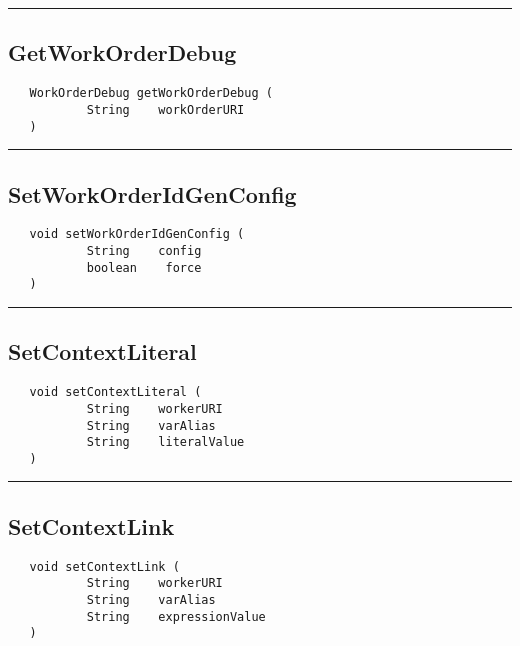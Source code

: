 \rule{15cm}{2pt}
\subsection{GetWorkOrderDebug}
\label{Api:GetWorkOrderDebug}
\begin{verbatim}
   WorkOrderDebug getWorkOrderDebug (
           String    workOrderURI
   )
\end{verbatim}



\rule{15cm}{2pt}
\subsection{SetWorkOrderIdGenConfig}
\label{Api:SetWorkOrderIdGenConfig}
\begin{verbatim}
   void setWorkOrderIdGenConfig (
           String    config
           boolean    force
   )
\end{verbatim}



\rule{15cm}{2pt}
\subsection{SetContextLiteral}
\label{Api:SetContextLiteral}
\begin{verbatim}
   void setContextLiteral (
           String    workerURI
           String    varAlias
           String    literalValue
   )
\end{verbatim}



\rule{15cm}{2pt}
\subsection{SetContextLink}
\label{Api:SetContextLink}
\begin{verbatim}
   void setContextLink (
           String    workerURI
           String    varAlias
           String    expressionValue
   )
\end{verbatim}



